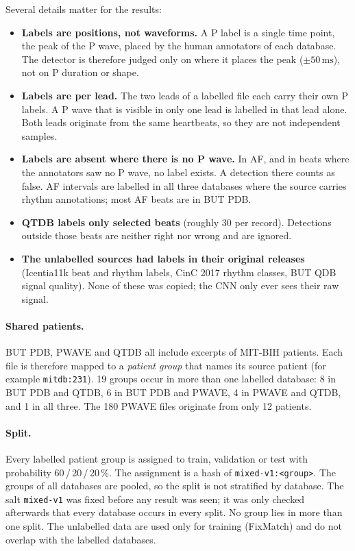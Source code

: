 \documentclass[11pt,a4paper]{article}
\newcommand{\code}[1]{\texttt{#1}}
\newcommand{\ms}{\,\mathrm{ms}}
\begin{document}
Several details matter for the results:
\begin{itemize}
\item \textbf{Labels are positions, not waveforms.} A P label is a single time point, the peak of the P wave, placed by the human annotators of each database. The detector is therefore judged only on where it places the peak ($\pm50\ms$), not on P duration or shape.
\item \textbf{Labels are per lead.} The two leads of a labelled file each carry their own P labels. A P wave that is visible in only one lead is labelled in that lead alone. Both leads originate from the same heartbeats, so they are not independent samples.
\item \textbf{Labels are absent where there is no P wave.} In AF, and in beats where the annotators saw no P wave, no label exists. A detection there counts as false. AF intervals are labelled in all three databases where the source carries rhythm annotations; most AF beats are in BUT PDB.
\item \textbf{QTDB labels only selected beats} (roughly 30 per record). Detections outside those beats are neither right nor wrong and are ignored.
\item \textbf{The unlabelled sources had labels in their original releases} (Icentia11k beat and rhythm labels, CinC 2017 rhythm classes, BUT QDB signal quality). None of these was copied; the CNN only ever sees their raw signal.
\end{itemize}

\paragraph{Shared patients.} BUT PDB, PWAVE and QTDB all include excerpts of MIT-BIH patients. Each file is therefore mapped to a \emph{patient group} that names its source patient (for example \code{mitdb:231}). 19 groups occur in more than one labelled database: 8 in BUT PDB and QTDB, 6 in BUT PDB and PWAVE, 4 in PWAVE and QTDB, and 1 in all three. The 180 PWAVE files originate from only 12 patients.

\paragraph{Split.} Every labelled patient group is assigned to train, validation or test with probability 60\,/\,20\,/\,20\,\%. The assignment is a hash of \code{mixed-v1:<group>}. The groups of all databases are pooled, so the split is not stratified by database. The salt \code{mixed-v1} was fixed before any result was seen; it was only checked afterwards that every database occurs in every split. No group lies in more than one split. The unlabelled data are used only for training (FixMatch) and do not overlap with the labelled databases.
\end{document}
